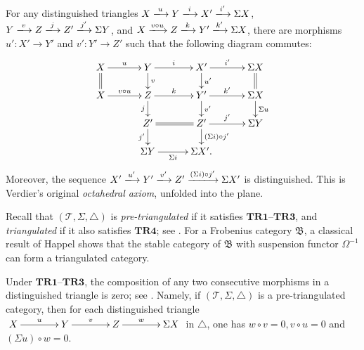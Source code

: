 \documentclass[a4paper,reqno,10pt]{amsart}
\numberwithin{equation}{section}
\begin{document}
\begin{definition}
\begin{description}[leftmargin=3.6em,style=nextline]
\item[$\mathbf{TR4}$]
For any distinguished triangles
$X\xlongrightarrow{u}Y\xlongrightarrow{i}X'
\xlongrightarrow{i'}\Sigma X$,
$Y\xlongrightarrow{v}Z\xlongrightarrow{j}Z'
\xlongrightarrow{j'}\Sigma Y$, and
$X\xlongrightarrow{v\circ u}Z\xlongrightarrow{k}Y'
\xlongrightarrow{k'}\Sigma X$, there are morphisms
$u':X'\longrightarrow Y'$ and $v':Y'\longrightarrow Z'$ such that the
following diagram commutes:
\[
\xymatrix@C=30pt@R=15pt{
X\ar[r]^-u\ar@{=}[d]&
Y\ar[r]^-i\ar[d]^-v&
X'\ar[r]^-{i'}\ar[d]^-{u'}&
\Sigma X\ar@{=}[d]\\
X\ar[r]^-{v\circ u}&
Z\ar[r]^-k\ar[d]_-j&
Y'\ar[r]^-{k'}\ar[d]^-{v'}&
\Sigma X\ar[d]^-{\Sigma u}\\
&Z'\ar@{=}[r]\ar[d]_-{j'}&
Z'\ar[r]^-{j'}\ar[d]^-{(\Sigma i)\circ j'}&
\Sigma Y\\
&\Sigma Y\ar[r]_-{\Sigma i}&\Sigma X'.
}
\]
Moreover, the sequence
$X'\xlongrightarrow{u'}Y'\xlongrightarrow{v'}Z'
\xlongrightarrow{(\Sigma i)\circ j'}\Sigma X'$ is distinguished.
This is Verdier's original \emph{octahedral axiom}, unfolded into the plane.
\end{description}

Recall that $(\mathcal T,\Sigma,\triangle)$ is \emph{pre-triangulated} if it
satisfies $\mathbf{TR1}$--$\mathbf{TR3}$, and \emph{triangulated} if it also satisfies
$\mathbf{TR4}$; see \cite[\S9.1]{Beligiannis2000}. 
For a Frobenius category $\mathfrak B$,  a classical result of Happel \cite[Theorem 2.6]{Happel1988} shows that the stable category of $\mathfrak B$ with suspension functor $\Omega^{-1}$ can form a triangulated category. 
\end{definition}

\begin{remark}\label{rem:consecutive-zero}
Under
$\mathbf{TR1}$--$\mathbf{TR3}$, the composition of any two consecutive morphisms in a distinguished triangle is zero; see  \cite[Remark~1.1.3]{Neeman2001}. Namely, if $(\mathcal T,\Sigma,\triangle)$ is a pre-triangulated category, then for each distinguished triangle $
\xymatrix@C=38pt{
X\ar[r]^-{u}&Y\ar[r]^-{v}&Z\ar[r]^-{w}&\Sigma X
}
$
in $\triangle$, one has $w\circ v=0, v\circ u=0$ and $(\Sigma u)\circ w=0$. 
\end{remark}
\end{document}

